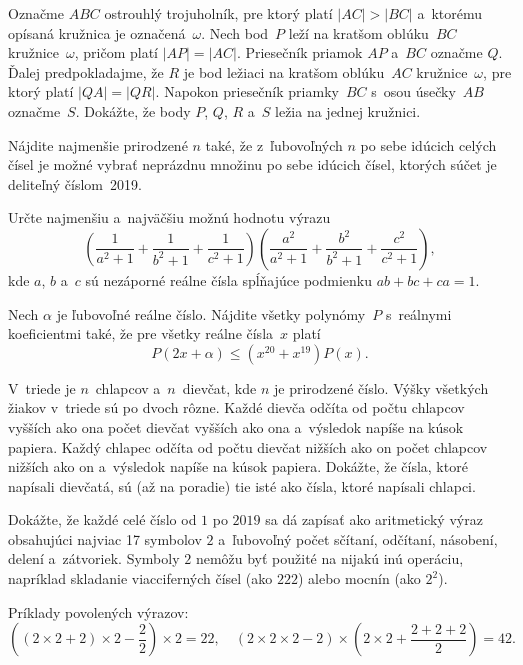 {%
Označme $ABC$ ostrouhlý trojuholník, pre ktorý platí $|AC|>|BC|$ a~ktorému opísaná kružnica je označená~$\omega$. Nech bod~$P$ leží na kratšom oblúku~$BC$ kružnice~$\omega$, pričom platí $|AP|=|AC|$. Priesečník priamok $AP$ a~$BC$ označme $Q$. Ďalej predpokladajme, že $R$ je bod ležiaci na kratšom oblúku~$AC$ kružnice~$\omega$, pre ktorý platí $|QA|=|QR|$. Napokon priesečník priamky~$BC$ s~osou úsečky~$AB$ označme~$S$.
Dokážte, že body $P$, $Q$, $R$ a~$S$ ležia na jednej kružnici.}

{%
Nájdite najmenšie prirodzené $n$ také, že z~ľubovoľných $n$ po sebe idúcich celých čísel je možné vybrať neprázdnu množinu po sebe idúcich čísel, ktorých súčet je deliteľný číslom~2019.
}

{%
Určte najmenšiu a~najväčšiu možnú hodnotu výrazu
$$
\left(\frac{1}{a^2+1}+\frac{1}{b^2+1}+\frac{1}{c^2+1}\right)\left(\frac{a^2}{a^2+1}+\frac{b^2}{b^2+1}+\frac{c^2}{c^2+1}\right),
$$
kde $a$, $b$ a~$c$ sú nezáporné reálne čísla spĺňajúce podmienku $ab+bc+ca=1$.
}

{%
Nech $\alpha$ je ľubovoľné reálne číslo. Nájdite všetky polynómy~$P$ s~reálnymi koeficientmi také, že pre všetky reálne čísla~$x$ platí
$$
P(2x+\alpha)\le \left(x^{20}+x^{19}\right)P(x).
$$}

{%
V~triede je $n$~chlapcov a~$n$~dievčat, kde $n$ je prirodzené číslo. Výšky všetkých žiakov v~triede sú po dvoch rôzne. Každé dievča odčíta od počtu chlapcov vyšších ako ona počet dievčat
vyšších ako ona a~výsledok napíše na kúsok papiera. Každý chlapec odčíta od počtu dievčat nižších ako on počet chlapcov nižších ako on a~výsledok napíše na kúsok papiera. Dokážte,
že čísla, ktoré napísali dievčatá, sú (až na poradie) tie isté ako čísla, ktoré napísali chlapci.}

{%
Dokážte, že každé celé číslo od $1$ po $2019$ sa dá zapísať ako aritmetický výraz obsahujúci najviac 17 symbolov $2$ a~ľubovoľný počet sčítaní, odčítaní, násobení, delení a~zátvoriek.
Symboly $2$ nemôžu byť použité na nijakú inú operáciu, napríklad skladanie viacciferných čísel (ako $222$) alebo mocnín (ako $2^2$).

Príklady povolených výrazov:
$$\left((2 \times 2+2) \times 2-\frac{2}{2}\right) \times 2=22,\quad (2 \times 2 \times 2-2) \times \left(2 \times 2+\frac{2+2+2}{2}\right)=42.$$}

